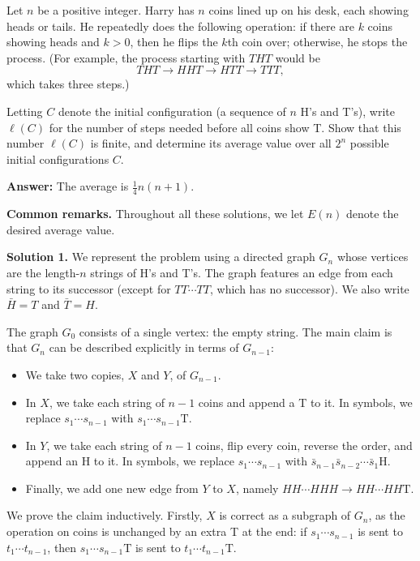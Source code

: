 \begin{problem}
    Let $n$ be a positive integer. Harry has $n$ coins lined up on his desk, each showing heads or tails. He repeatedly does the following operation: if there are $k$ coins showing heads and $k > 0$, then he flips the $k$th coin over; otherwise, he stops the process. (For example, the process starting with $THT$ would be 
    \[
    THT \rightarrow HHT \rightarrow HTT \rightarrow TTT,
    \]
    which takes three steps.)

    Letting $C$ denote the initial configuration (a sequence of $n$ H's and T's), write $\ell(C)$ for the number of steps needed before all coins show T. Show that this number $\ell(C)$ is finite, and determine its average value over all $2^n$ possible initial configurations $C$.
\end{problem}

\textbf{Answer:} The average is $\frac{1}{4}n(n+1)$.

\textbf{Common remarks.} Throughout all these solutions, we let $E(n)$ denote the desired average value.

\bigskip

\textbf{Solution 1.} We represent the problem using a directed graph $G_n$ whose vertices are the length-$n$ strings of H's and T's. The graph features an edge from each string to its successor (except for $TT\cdots TT$, which has no successor). We also write $\bar{H} = T$ and $\bar{T} = H$.

The graph $G_0$ consists of a single vertex: the empty string. The main claim is that $G_n$ can be described explicitly in terms of $G_{n-1}$:

\begin{itemize}
  \item We take two copies, $X$ and $Y$, of $G_{n-1}$.
  \item In $X$, we take each string of $n-1$ coins and append a T to it. In symbols, we replace $s_1\cdots s_{n-1}$ with $s_1\cdots s_{n-1}\text{T}$.
  \item In $Y$, we take each string of $n-1$ coins, flip every coin, reverse the order, and append an H to it. In symbols, we replace $s_1\cdots s_{n-1}$ with $\bar{s}_{n-1}\bar{s}_{n-2}\cdots\bar{s}_1\text{H}$.
  \item Finally, we add one new edge from $Y$ to $X$, namely $HH\cdots HHH \to HH\cdots HH\text{T}$.
\end{itemize}

We prove the claim inductively. Firstly, $X$ is correct as a subgraph of $G_n$, as the operation on coins is unchanged by an extra T at the end: if $s_1\cdots s_{n-1}$ is sent to $t_1\cdots t_{n-1}$, then $s_1\cdots s_{n-1}\text{T}$ is sent to $t_1\cdots t_{n-1}\text{T}$.

